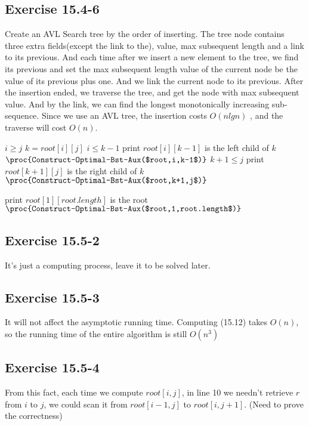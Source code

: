\documentclass[12pt]{article}
\theoremstyle{definition}
\theoremstyle{remark}
\begin{document}
\subsection*{Exercise 15.4-6}
Create an AVL Search tree by the order of inserting. The tree node contains three extra fields(except the link to the), value, max subsequent length and a link to its previous. And each time after we insert a new element to the tree, we find its previous and set the max subsequent length value of the current node be the value of its previous plus one. And we link the current node to its previous. After the insertion ended, we traverse the tree, and get the node with max subsequent value. And by the link, we can find the longest monotonically increasing sub-sequence. Since we use an AVL tree, the insertion costs $O(nlgn)$ , and the traverse will cost $O(n)$.
\begin{codebox}
\li \If $i\ge j$ \label{li:if}
\li \quad \Return
\li $k=root[i][j]$
\li \If $i\le k-1$ \label{li:if}
\li \quad print $root[i][k-1]$ is the left child of $k$
\li \quad $\proc{Construct-Optimal-Bst-Aux($root,i,k-1$)}$
\li \If $k+1\le j$ \label{li:if}
\li \quad print $root[k+1][j]$ is the right child of $k$
\li \quad $\proc{Construct-Optimal-Bst-Aux($root,k+1,j$)}$
\end{codebox}
\begin{codebox}
\li print $root[1][root.length]$ is the root
\li $\proc{Construct-Optimal-Bst-Aux($root,1,root.length$)}$
\end{codebox}
\subsection*{Exercise 15.5-2}
It's just a computing process, leave it to be solved later.
\subsection*{Exercise 15.5-3}
It will not affect the asymptotic running time. Computing (15.12) takes $O(n)$, so the running time of the entire algorithm is still $O(n^3)$
\subsection*{Exercise 15.5-4}
From this fact, each time we compute $root[i,j]$, in line 10 we needn't retrieve $r$ from $i$ to $j$, we could scan it from $root[i-1,j]$ to $root[i,j+1]$. (Need to prove the correctness)
\end{document}
